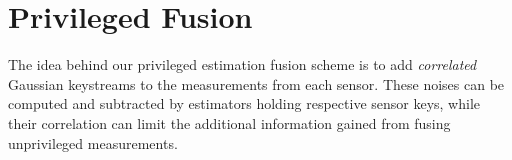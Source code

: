 \documentclass[letterpaper, 10 pt, conference]{ieeeconf}
\begin{document}
\section{Privileged Fusion}\label{sec:scheme}
The idea behind our privileged estimation fusion scheme is to add \textit{correlated} Gaussian keystreams to the measurements from each sensor. These noises can be computed and subtracted by estimators holding respective sensor keys, while their correlation can limit the additional information gained from fusing unprivileged measurements. 

% 
% 
\end{document}
